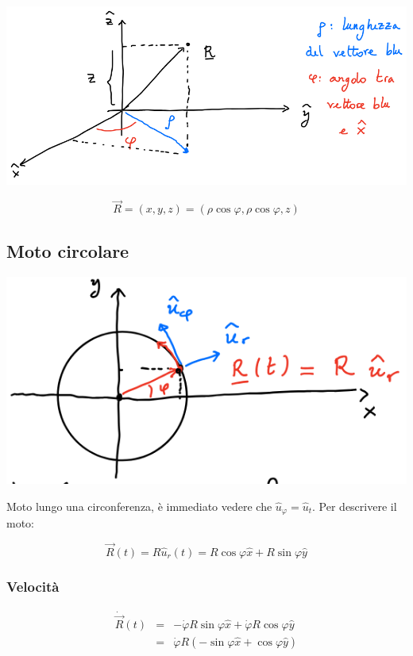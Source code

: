 \documentclass{article}
\begin{document}
\includegraphics[width=\columnwidth]{esempio-coordinate-cilindriche}

$$
\vec{R} = (x,y,z) = (\rho \cos{\varphi}, \rho \cos{\varphi}, z)
$$

\subsection{Moto circolare}

\includegraphics[width=\columnwidth]{esempio-moto-circolare}

\noindent
Moto lungo una circonferenza, è immediato vedere che $\hat{u}_\varphi = \hat{u}_t$.
Per descrivere il moto:

$$
\vec{R}(t) = R \hat{u}_r(t) = R \cos{\varphi} \hat{x} + R \sin{\varphi} \hat{y}
$$

\subsubsection{Velocità}

$$
\begin{matrix}
\dot{\vec{R}}(t) &=& -\dot{\varphi} R \sin{\varphi} \hat{x} + \dot{\varphi} R \cos{\varphi} \hat{y} \\
&=& \dot{\varphi} R (-\sin{\varphi} \hat{x} + \cos{\varphi} \hat{y})
\end{matrix}
$$
\end{document}
